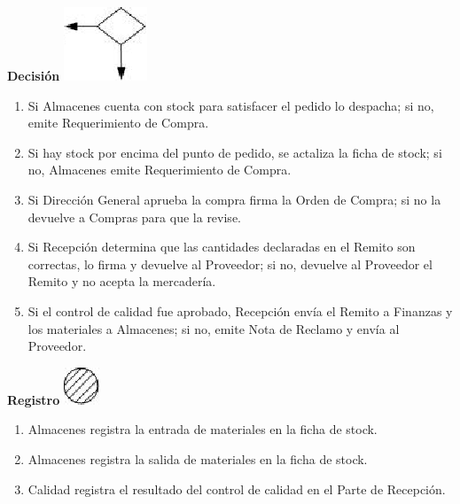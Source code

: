 \begin{center}
  \textbf{Decisión}
  \includegraphics{./Images/Simbolos/simbolo-Decision.png}
\end{center}
\begin{enumerate}
  \item Si Almacenes cuenta con stock para satisfacer el pedido lo despacha; si no, emite Requerimiento de Compra.
  \item Si hay stock por encima del punto de pedido, se actaliza la ficha de stock; si no, Almacenes emite Requerimiento de Compra.
  \item Si Dirección General aprueba la compra firma la Orden de Compra; si no la devuelve a Compras para que la revise.
  \item Si Recepción determina que las cantidades declaradas en el Remito son correctas, lo firma y devuelve al Proveedor; si no, devuelve al Proveedor el Remito y no acepta la mercadería.
  \item Si el control de calidad fue aprobado, Recepción envía el Remito a Finanzas y los materiales a Almacenes; si no, emite Nota de Reclamo y envía al Proveedor.
\end{enumerate}

\begin{center}
  \textbf{Registro}
  \includegraphics{./Images/Simbolos/simbolo-Registro.png}
\end{center}
\begin{enumerate}
  \item Almacenes registra la entrada de materiales en la ficha de stock.
  \item Almacenes registra la salida de materiales en la ficha de stock.
  \item Calidad registra el resultado del control de calidad en el Parte de Recepción.
\end{enumerate}


